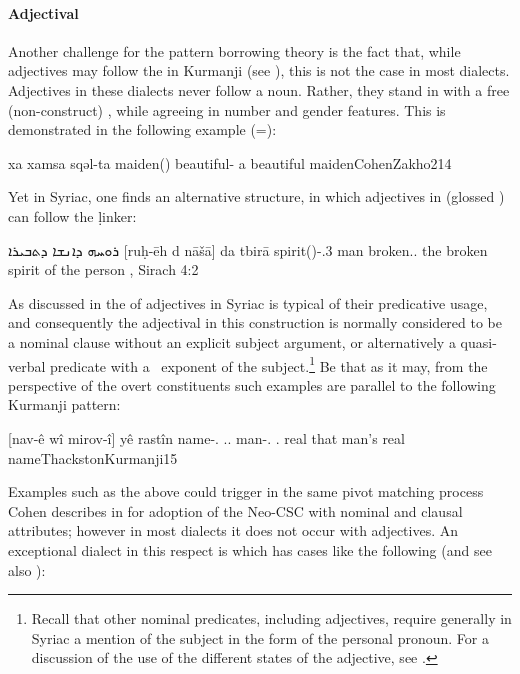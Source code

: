 \paragraph{Adjectival \secns} \label{par:adj_secn}

Another challenge for the pattern borrowing theory is the fact that, while adjectives may follow the \ez* in Kurmanji (see ), this is not the case in most  dialects. Adjectives in these dialects never follow  a  noun. Rather, they stand in  with a free (non-construct)  , while agreeing  in number and gender features. This is demonstrated in the following example (=):

{xa xamsa sqəl-ta}
{\indef{} maiden(\fem) beautiful-\fem}
{a beautiful maiden}{CohenZakho}{214} 

Yet in  Syriac, one finds an alternative structure, in which adjectives in  (glossed \abs) can follow the \d linker:

{ܪܘܚܗ ܕܐܢܫܐ ܕܬܒܝܪܐ}
{[ruḥ-ēh d\cb{} nāšā] da\cb{} tbirā}
{spirit(\fem)-\poss.3\masc{} \lnk\cb{} man \lnk\cb{} broken.\abs.\fem}
{the broken spirit of the person} 
{\Pesh, Sirach 4:2 \apud \cite[232]{PeursenBenSira}}

As discussed in  the \abs* of adjectives in Syriac is typical of their predicative usage, and consequently the adjectival \secn in this construction is normally considered to be a nominal clause without an explicit subject argument, or alternatively a quasi-verbal predicate with a \zero\ exponent of the subject.\footnote{Recall that other nominal predicates, including \emp* adjectives, require generally in Syriac a mention of the subject in the form of the  personal pronoun. For a discussion of the use of the different states of the adjective, see \citet{GoldenbergPredicative}.}
 Be that as it may, from the perspective of the overt constituents such examples are parallel to the following Kurmanji pattern:

{[nav-ê wî mirov-î] yê rastîn}
{\hspace{0.7ex}name-\ez.\masc{} \dem.\far.\obl{}  man-\obl.\masc{} \ez.\masc{} real}
{that man's real name}{ThackstonKurmanji}{15}

Examples such as the above could trigger in  the same  pivot matching process Cohen describes in \JZax for adoption of the Neo-CSC with nominal and clausal attributes; however in most  dialects it does not occur with adjectives. An exceptional dialect in this respect is \Arb which has cases like the following (and see also ):

